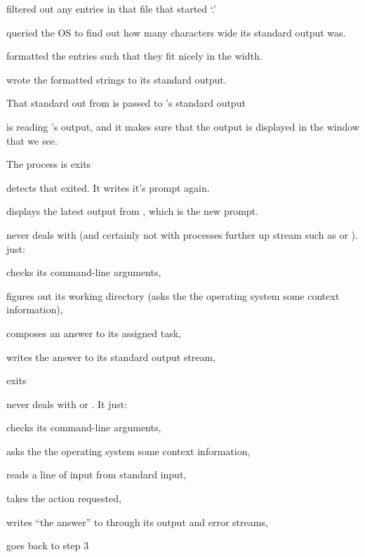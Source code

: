 \documentclass[landscape]{foils}
\begin{document}
\begin{compactitem}
	\item {} filtered out any entries in that file that started `.'
	\item {} queried the OS to find out how many characters wide its standard output was.
	\item {} formatted the entries such that they fit nicely in the width.
	\item {} wrote the formatted strings to its standard output.
	\item {\color{red}That standard out from  is passed to 's standard output}
	\item {\color{green} is reading 's output, and it makes sure that the output is displayed in the window that we see.}
	\item The  process is exits
	\item {\color{red} detects that  exited. It writes it's prompt again.}
	\item {\color{green} displays the latest output from , which is the new prompt.}	
		
\end{compactitem}


\myNewSlide
{} never deals with  (and certainly not with processes further up stream such as  or ).
 just:
\begin{compactitem}	
	\item checks its command-line arguments,
	\item figures out its working directory (asks the the operating system some context information),
	\item composes an answer to its assigned task,
	\item writes the answer to its standard output stream,
	\item exits
\end{compactitem}

\myNewSlide
{} never deals with  or .  It just:
\begin{compactenum}	
	\item checks its command-line arguments,
	\item asks the the operating system some context information,
	 \item reads a line of input from standard input,
	\item takes the action requested,
	\item writes ``the answer'' to through its output and error streams,
	\item goes back to step 3
\end{compactenum}
\end{document}
